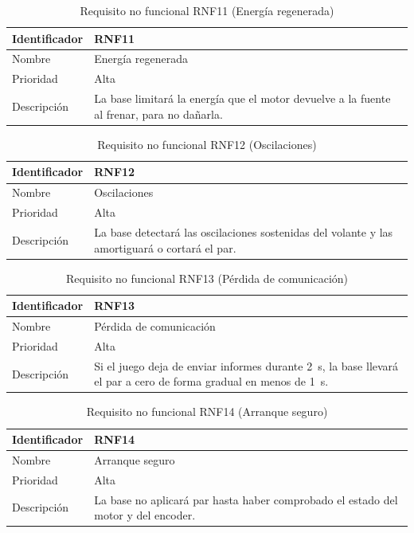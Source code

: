 \begin{table}[H]
	\centering
	\renewcommand{\arraystretch}{2}
	\begin{tabular}{|l|p{10cm}|}
		\hline
		Identificador & RNF11 \\
		\hline
		Nombre & Energía regenerada \\
		\hline
		Prioridad & Alta \\
		\hline
		Descripción & La base limitará la energía que el motor devuelve a la fuente al frenar, para no dañarla. \\
		\hline
	\end{tabular}
	\caption{Requisito no funcional RNF11 (Energía regenerada)}
	\label{tab:rnf11}
\end{table}

\begin{table}[H]
	\centering
	\renewcommand{\arraystretch}{2}
	\begin{tabular}{|l|p{10cm}|}
		\hline
		Identificador & RNF12 \\
		\hline
		Nombre & Oscilaciones \\
		\hline
		Prioridad & Alta \\
		\hline
		Descripción & La base detectará las oscilaciones sostenidas del volante y las amortiguará o cortará el par. \\
		\hline
	\end{tabular}
	\caption{Requisito no funcional RNF12 (Oscilaciones)}
	\label{tab:rnf12}
\end{table}

\begin{table}[H]
	\centering
	\renewcommand{\arraystretch}{2}
	\begin{tabular}{|l|p{10cm}|}
		\hline
		Identificador & RNF13 \\
		\hline
		Nombre & Pérdida de comunicación \\
		\hline
		Prioridad & Alta \\
		\hline
		Descripción & Si el juego deja de enviar informes durante 2~s, la base llevará el par a cero de forma gradual en menos de 1~s. \\
		\hline
	\end{tabular}
	\caption{Requisito no funcional RNF13 (Pérdida de comunicación)}
	\label{tab:rnf13}
\end{table}

\begin{table}[H]
	\centering
	\renewcommand{\arraystretch}{2}
	\begin{tabular}{|l|p{10cm}|}
		\hline
		Identificador & RNF14 \\
		\hline
		Nombre & Arranque seguro \\
		\hline
		Prioridad & Alta \\
		\hline
		Descripción & La base no aplicará par hasta haber comprobado el estado del motor y del encoder. \\
		\hline
	\end{tabular}
	\caption{Requisito no funcional RNF14 (Arranque seguro)}
	\label{tab:rnf14}
\end{table}

